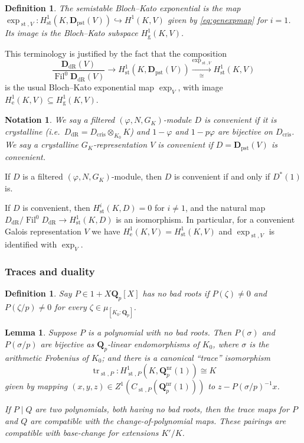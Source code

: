 \documentclass[cjm]{ipart}
\theoremstyle{plain}
\newtheorem{lemma}[theorem]{Lemma}
\newtheorem{definition}[theorem]{Definition}
\newtheorem{notation}[theorem]{Notation}
\theoremstyle{remark}
\DeclareMathOperator{\Fil}{Fil}
\DeclareMathOperator{\st}{st}
\DeclareMathOperator{\tr}{tr}
\newcommand{\DdR}{\mathbf{D}_{\mathrm{dR}}}
\newcommand{\Dpst}{\mathbf{D}_{\mathrm{pst}}}
\newcommand{\QQ}{\mathbf{Q}}
\newcommand{\Qp}{\QQ_p}
\newcommand{\dR}{\mathrm{dR}}
\newcommand{\into}{\hookrightarrow}
\numberwithin{equation}{subsection}
\begin{document}
   \begin{definition}
    The \emph{semistable Bloch--Kato exponential} is the map $\exp_{\st, V}: H^1_{\st}(K, \Dpst(V)) \into H^1(K, V)$ given by \eqref{eq:genexpmap} for $i = 1$. Its image is the Bloch--Kato subspace $H^1_{\mathrm{g}}(K, V)$.
   \end{definition}

   This terminology is justified by the fact that the composition
   \[
    \frac{\DdR(V)}{\Fil^0 \DdR(V)} \to H^1_{\st}(K, \Dpst(V)) \xrightarrow[\cong]{\exp_{\st, V}} H^1_{\st}(K, V)
   \]
   is the usual Bloch--Kato exponential map $\exp_V$, with image $H^1_{\mathrm{e}}(K, V) \subseteq H^1_{\mathrm{g}}(K, V)$.

   \begin{notation}
    We say a filtered $(\varphi, N, G_K)$-module $D$ is \emph{convenient} if it is crystalline (i.e.~$D_{\dR} = D_{\mathrm{cris}} \otimes_{K_0} K$) and $1-\varphi$ and $1 - p\varphi$ are bijective on $D_{\mathrm{cris}}$. We say a crystalline $G_K$-representation $V$ is convenient if $D = \Dpst(V)$ is convenient.
   \end{notation}

   \begin{note}
    If $D$ is a filtered $(\varphi, N, G_K)$-module, then $D$ is convenient if and only if $D^*(1)$ is.
   \end{note}

   If $D$ is convenient, then $H^i_{\st}(K, D) = 0$ for $i \ne 1$, and the natural map $D_{\dR} / \Fil^0 D_{\dR} \to H^1_{\mathrm{st}}(K, D)$ is an isomorphism. In particular, for a convenient Galois representation $V$ we have $H^1_{\mathrm{e}}(K, V) = H^1_{\st}(K, V)$ and $\exp_{\st, V}$ is identified with $\exp_V$.


  \subsubsection*{Traces and duality}

  \begin{definition}
   Say $P \in 1 + X \Qp[X]$ has \emph{no bad roots} if $P(\zeta) \ne 0$ and $P(\zeta/p) \ne 0$ for every $\zeta \in \mu_{[K_0 : \Qp]}$.
  \end{definition}

   \begin{lemma}
    \label{lemma:abstracttrace}
    Suppose $P$ is a polynomial with no bad roots. Then $P(\sigma)$ and $P(\sigma / p)$ are bijective as $\Qp$-linear endomorphisms of $K_0$, where $\sigma$ is the arithmetic Frobenius of $K_0$; and there is a canonical ``trace'' isomorphism
    \[ \tr_{\st, P}: H^1_{\st, P}(K, \Qp^{\mathrm{nr}}(1)) \cong K \]
    given by mapping $(x, y, z) \in Z^1(C_{\st, P}(\Qp^{\mathrm{nr}}(1)))$ to $z - P(\sigma/p)^{-1} x$.

    If $P \mid Q$ are two polynomials, both having no bad roots, then the trace maps for $P$ and $Q$ are compatible with the change-of-polynomial maps. These pairings are compatible with base-change for extensions $K' / K$.
   \end{lemma}
\end{document}
